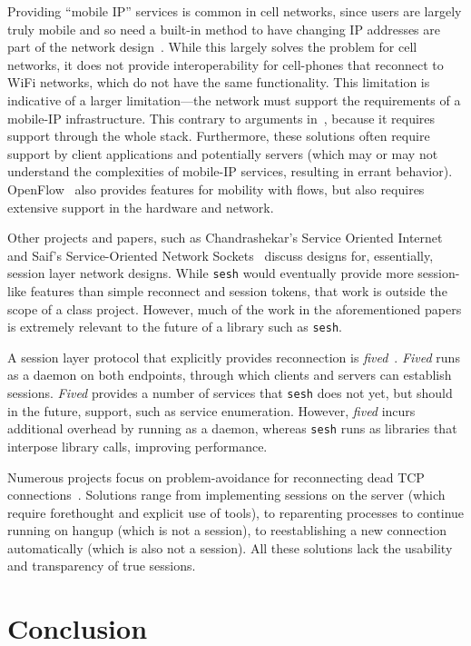\documentclass[twocolumn,10pt]{article}
\begin{document}
Providing ``mobile IP'' services is common in cell networks, since users are
largely truly mobile and so need a built-in method to have changing IP addresses
are part of the network design~\cite{ltemob,mobileip,Kurose}. While this largely
solves the problem for cell networks, it does not provide interoperability for
cell-phones that reconnect to WiFi networks, which do not have the same
functionality. This limitation is indicative of a larger limitation---the
network must support the requirements of a mobile-IP infrastructure. This
contrary to arguments in~\cite{Saltzer}, because it requires support through the
whole stack. Furthermore, these solutions often require support by client
applications and potentially servers (which may or may not understand the
complexities of mobile-IP services, resulting in errant behavior).
OpenFlow~\cite{McKeown} also
provides features for mobility with flows, but also requires extensive support
in the hardware and network.

Other projects and papers, such as Chandrashekar's Service Oriented
Internet~\cite{chandrashekar2003service} and Saif's Service-Oriented Network
Sockets~\cite{Saif} discuss designs for, essentially, session layer network designs.
While \texttt{sesh} would eventually provide more session-like features than
simple reconnect and session tokens, that work is outside the scope of a class
project. However, much of the work in the aforementioned papers is extremely
relevant to the future of a library such as \texttt{sesh}.

A session layer protocol that explicitly provides reconnection is
\textit{fived}~\cite{wasptr-15-01}. \textit{Fived} runs as a daemon on both
endpoints, through which clients and servers can establish sessions.
\textit{Fived} provides a number of services that \texttt{sesh} does not yet,
but should in the future, support, such as service enumeration. However,
\textit{fived} incurs additional overhead by running as a daemon, whereas
\texttt{sesh} runs as libraries that interpose library calls, improving
performance.

Numerous projects focus on problem-avoidance for reconnecting dead TCP
connections~\cite{mosh,autossh,screen,tmux}. Solutions range from implementing
sessions on the server (which require forethought and explicit use of tools), to
reparenting processes to continue running on hangup (which is not a session), to
reestablishing a new connection automatically (which is also not a session). All
these solutions lack the usability and transparency of true sessions.

\section{Conclusion}















\end{document}
